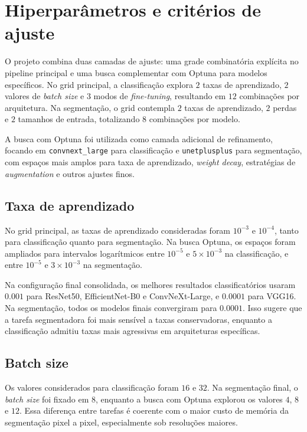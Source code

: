 \documentclass[tcc,capa]{texufpel}
\begin{document}
\section{Hiperparâmetros e critérios de ajuste}

O projeto combina duas camadas de ajuste: uma grade combinatória explícita no pipeline principal e uma busca complementar com Optuna para modelos específicos. No grid principal, a classificação explora \(2\) taxas de aprendizado, \(2\) valores de \textit{batch size} e \(3\) modos de \textit{fine-tuning}, resultando em \(12\) combinações por arquitetura. Na segmentação, o grid contempla \(2\) taxas de aprendizado, \(2\) perdas e \(2\) tamanhos de entrada, totalizando \(8\) combinações por modelo.

A busca com Optuna foi utilizada como camada adicional de refinamento, focando em \texttt{convnext\_large} para classificação e \texttt{unetplusplus} para segmentação, com espaços mais amplos para taxa de aprendizado, \textit{weight decay}, estratégias de \textit{augmentation} e outros ajustes finos.

\subsection{Taxa de aprendizado}

No grid principal, as taxas de aprendizado consideradas foram \(10^{-3}\) e \(10^{-4}\), tanto para classificação quanto para segmentação. Na busca Optuna, os espaços foram ampliados para intervalos logarítmicos entre \(10^{-5}\) e \(5\times 10^{-3}\) na classificação, e entre \(10^{-5}\) e \(3\times 10^{-3}\) na segmentação.

Na configuração final consolidada, os melhores resultados classificatórios usaram \(0.001\) para ResNet50, EfficientNet-B0 e ConvNeXt-Large, e \(0.0001\) para VGG16. Na segmentação, todos os modelos finais convergiram para \(0.0001\). Isso sugere que a tarefa segmentadora foi mais sensível a taxas conservadoras, enquanto a classificação admitiu taxas mais agressivas em arquiteturas específicas.

\subsection{Batch size}

Os valores considerados para classificação foram \(16\) e \(32\). Na segmentação final, o \textit{batch size} foi fixado em \(8\), enquanto a busca com Optuna explorou os valores \(4\), \(8\) e \(12\). Essa diferença entre tarefas é coerente com o maior custo de memória da segmentação pixel a pixel, especialmente sob resoluções maiores.
\end{document}
